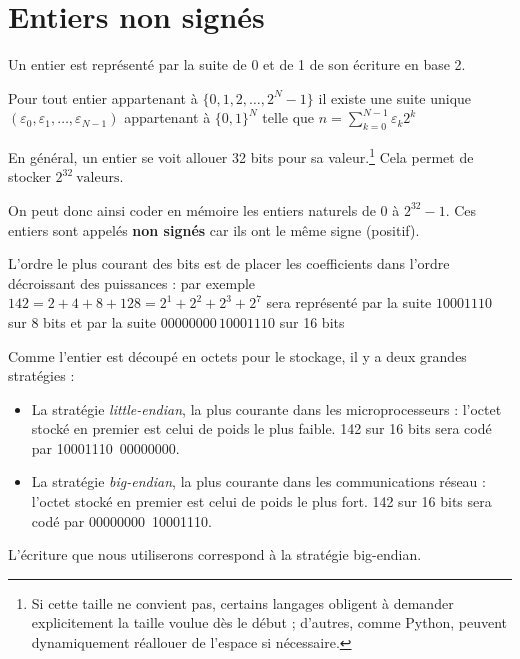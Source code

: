 \section{Entiers non signés}
Un entier est représenté par la suite de 0 et de 1 de son écriture en base 2.
\begin{thm}
Pour tout entier appartenant à $\{0, 1, 2, \ldots, 2^N - 1\}$ il existe une suite unique $(\varepsilon_0, \varepsilon_1, \ldots, \varepsilon_{N-1})$ appartenant à $\{0,1\}^N$ telle que $\displaystyle n = \sum_{k=0}^{N-1}\varepsilon_k 2^k$
\end{thm}
En général, un entier se voit allouer 32 bits pour sa valeur.\footnote{Si cette taille ne convient pas, certains langages obligent à demander explicitement la taille voulue dès le début ; d'autres, comme Python, peuvent dynamiquement réallouer de l'espace si nécessaire.} Cela permet de stocker $2^{32}~\text{valeurs}$.

On peut donc ainsi coder en mémoire les entiers naturels de 0 à $2^{32}-1$. Ces entiers sont appelés {\bf non signés} car ils ont le même signe (positif).

L'ordre le plus courant des bits est de placer les coefficients dans l'ordre décroissant des puissances : par exemple 
$\displaystyle 142 = 2 + 4 + 8 + 128=2^1 + 2^2+ 2^3 + 2^7$ sera représenté par la suite $10001110$ sur 8 bits et par la suite $00000000\,10001110$ sur 16 bits

Comme l'entier est découpé en octets pour le stockage, il y a deux grandes stratégies :
\begin{itemize}
	\item La stratégie \emph{little-endian}, la plus courante dans les microprocesseurs : l'octet stocké en premier est celui de poids le plus faible. 142 sur 16  bits sera codé par 10001110~00000000.
	\item La stratégie \emph{big-endian}, la plus courante dans les communications réseau : l'octet stocké en premier est celui de poids le plus fort. 142 sur 16  bits sera codé par 00000000~10001110.
\end{itemize}
L'écriture que nous utiliserons correspond à la stratégie big-endian.

